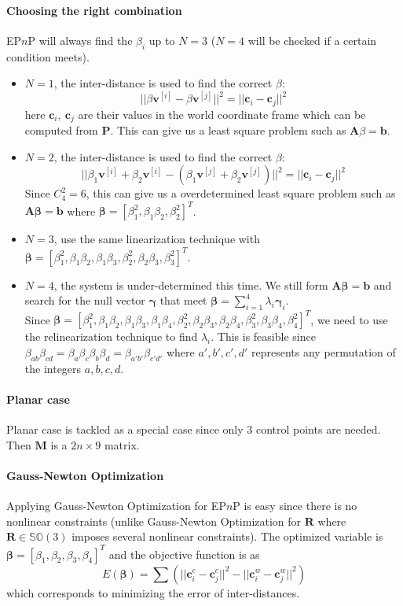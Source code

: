 \documentclass[a4paper]{article}
\begin{document}
\paragraph{Choosing the right combination}
EP$n$P will always find the $\beta_i$ up to $N=3$ ($N=4$ will be checked if a certain condition meets). 
\begin{itemize}
\item $N=1$, the inter-distance is used to find the correct $\beta$:
$$
||\beta\mathbf{v}^{[i]}-\beta\mathbf{v}^{[j]}||^2=||\mathbf{c}_i-\mathbf{c}_j||^2
$$
here $\mathbf{c}_i,\ \mathbf{c}_j$ are their values in the world coordinate frame which can be computed from $\mathbf{P}$. This can give us a least square problem such as $\mathbf{A}\beta=\mathbf{b}$.
\item $N=2$, the inter-distance is used to find the correct $\beta$:
$$
||\beta_1\mathbf{v}^{[i]}+\beta_2\mathbf{v}^{[i]}-(\beta_1\mathbf{v}^{[j]}+\beta_2\mathbf{v}^{[j]})||^2=||\mathbf{c}_i-\mathbf{c}_j||^2
$$
Since $C_{4}^{2}=6$, this can give us a overdetermined least square problem such as $\mathbf{A}\bm{\beta}=\mathbf{b}$ where $\bm{\beta}=[\beta_1^2,\beta_1\beta_2,\beta_2^2]^T$.
\item $N=3$, use the same linearization technique with $\bm{\beta}=[\beta_1^2,\beta_1\beta_2,\beta_1\beta_3,\beta_2^2,\beta_2\beta_3,\beta_3^2]^T$. 
\item $N=4$, the system is under-determined this time. We still form $\mathbf{A}\bm{\beta}=\mathbf{b}$ and search for the null vector $\bm{\gamma}$ that meet $\bm{\beta}=\sum_{i=1}^{4}\lambda_i \bm{\gamma}_i$. \\
Since $\bm{\beta}=[\beta_1^2,\beta_1\beta_2,\beta_1\beta_3,\beta_1\beta_4,\beta_2^2,\beta_2\beta_3,\beta_2\beta_4,\beta_3^2,\beta_3\beta_4,\beta_4^2]^T$, we need to use the relinearization technique to find $\lambda_i$. This is feasible since $\beta_{ab}\beta_{cd}=\beta_{a}\beta_{c}\beta_{b}\beta_{d}=\beta_{a'b'}\beta_{c'd'}$ where ${a',b',c',d'}$ represents any permutation of the integers ${a,b,c,d}$.
\end{itemize}

\paragraph{Planar case}
Planar case is tackled as a special case since only $3$ control points are needed. Then $\mathbf{M}$ is a $2n \times 9$ matrix.

\paragraph{Gauss-Newton Optimization}
Applying Gauss-Newton Optimization for EP$n$P is easy since there is no nonlinear constraints (unlike Gauss-Newton Optimization for $\mathbf{R}$ where $\mathbf{R} \in \mathbb{SO}(3)$ imposes several nonlinear constraints). The optimized variable is $\bm{\beta}=[\beta_1,\beta_2, \beta_3, \beta_4]^T$ and the objective function is as 
$$
E(\bm{\beta})=\sum \left( 
||\mathbf{c}^{c}_i-\mathbf{c}^{c}_j||^2-||\mathbf{c}^{w}_i-\mathbf{c}^{w}_j||^2
\right)
$$
which corresponds to minimizing the error of inter-distances.
\end{document}
